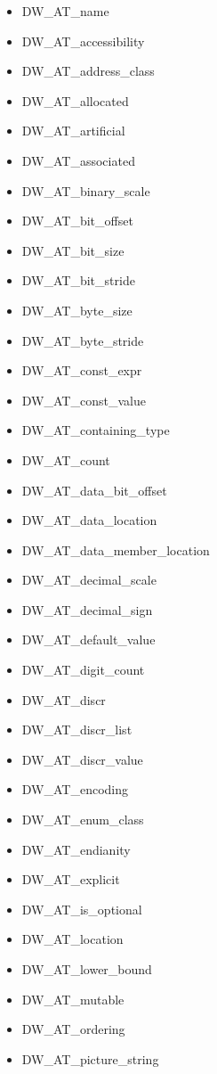 \begin{enumerate}[1.]
\begin{itemize}
\item DW\-\_AT\-\_name
\item DW\-\_AT\-\_accessibility
\item DW\-\_AT\-\_address\-\_class
\item DW\-\_AT\-\_allocated
\item DW\-\_AT\-\_artificial
\item DW\-\_AT\-\_associated
\item DW\-\_AT\-\_binary\-\_scale
\item DW\-\_AT\-\_bit\-\_offset
\item DW\-\_AT\-\_bit\-\_size
\item DW\-\_AT\-\_bit\-\_stride
\item DW\-\_AT\-\_byte\-\_size
\item DW\-\_AT\-\_byte\-\_stride
\item DW\-\_AT\-\_const\-\_expr
\item DW\-\_AT\-\_const\-\_value
\item DW\-\_AT\-\_containing\-\_type
\item DW\-\_AT\-\_count
\item DW\-\_AT\-\_data\-\_bit\-\_offset
\item DW\-\_AT\-\_data\-\_location
\item DW\-\_AT\-\_data\-\_member\-\_location
\item DW\-\_AT\-\_decimal\-\_scale
\item DW\-\_AT\-\_decimal\-\_sign
\item DW\-\_AT\-\_default\-\_value
\item DW\-\_AT\-\_digit\-\_count
\item DW\-\_AT\-\_discr
\item DW\-\_AT\-\_discr\-\_list
\item DW\-\_AT\-\_discr\-\_value
\item DW\-\_AT\-\_encoding
\item DW\-\_AT\-\_enum\-\_class
\item DW\-\_AT\-\_endianity
\item DW\-\_AT\-\_explicit
\item DW\-\_AT\-\_is\-\_optional
\item DW\-\_AT\-\_location
\item DW\-\_AT\-\_lower\-\_bound
\item DW\-\_AT\-\_mutable
\item DW\-\_AT\-\_ordering
\item DW\-\_AT\-\_picture\-\_string

\end{itemize}
\end{enumerate}
